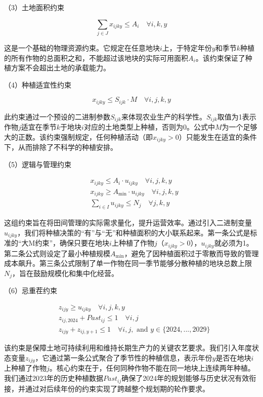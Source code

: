 \documentclass[withoutpreface,bwprint]{cumcmthesis} %
\begin{document}
（3）土地面积约束

\begin{equation}
	\sum_{j \in J} x_{ijky} \le A_i \quad \forall i, k, y
\end{equation}

这是一个基础的物理资源约束。它规定在任意地块$i$上，于特定年份$y$和季节$k$种植的所有作物的总面积之和，不能超过该地块的实际可用面积$A_i$。该约束保证了种植方案不会超出土地的承载能力。

（4）种植适宜性约束

\begin{equation}
	x_{ijky} \le S_{ijk} \cdot M \quad \forall i, j, k, y
\end{equation}

此约束通过一个预设的二进制参数$S_{ijk}$来体现农业生产的科学性。$S_{ijk}$取值为1表示作物$j$适宜在季节$k$于地块$i$对应的土地类型上种植，否则为0。公式中$M$为一个足够大的正数。该约束强制规定，任何种植活动（即$x_{ijky} > 0$）只能发生在适宜的条件下，从而排除了不科学的种植安排。

（5）逻辑与管理约束


\begin{align}
	 & x_{ijky} \le A_i \cdot u_{ijky} \quad \forall i, j, k, y      \\
	 & x_{ijky} \ge A_{\min} \cdot u_{ijky} \quad \forall i, j, k, y \\
	 & \sum_{i \in I} u_{ijky} \le N_j \quad \forall j, k, y
\end{align}


这组约束旨在将田间管理的实际需求量化，提升运营效率。通过引入二进制变量$u_{ijky}$，我们将种植决策的“有”与“无”和种植面积的大小联系起来。第一条公式是标准的“大M约束”，确保只要在地块$i$上种植了作物$j$（$x_{ijky} > 0$），$u_{ijky}$就必须为1。第二条公式则设定了最小种植规模$A_{\min}$，避免了因种植面积过于零散而导致的管理成本飙升。第三条公式限制了单一作物在同一季节能够分散种植的地块总数上限$N_j$，旨在鼓励规模化和集中化经营。

（6）忌重茬约束


\begin{align}
	 & z_{ijy} \ge u_{ijky} \quad \forall i, j, k, y                                       \\
	 & z_{ij,2024} + Past_{ij} \le 1 \quad \forall i, j                                    \\
	 & z_{ijy} + z_{ij,y+1} \le 1 \quad \forall i, j, \text{ and } y \in \{2024,...,2029\}
\end{align}


该约束是保障土地可持续利用和维持长期生产力的关键农艺要求。我们引入年度状态变量$z_{ijy}$，它通过第一条公式聚合了季节性的种植信息，表示年份$y$是否在地块$i$上种植了作物$j$。核心约束在于，任何同种作物不能在同一地块上连续两年种植。我们通过2023年的历史种植数据$Past_{ij}$确保了2024年的规划能够与历史状况有效衔接，并通过对后续年份的约束实现了跨越整个规划期的轮作要求。
\end{document}

